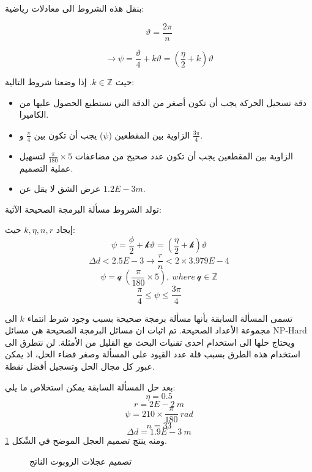 بنقل هذه الشروط الى معادلات رياضية:

\begin{equation}
\vartheta=\frac{2\pi}{n}
\end{equation}

\begin{equation}
	\rightarrow\psi=\frac{\vartheta}{4}+{k}\vartheta=\left(\frac{\eta}{2}+{k}\right)\vartheta
\end{equation}

حيث $ {k}\in\mathbb{Z} $. إذا وضعنا شروط التالية:

\begin{itemize}
	\item دقة تسجيل الحركة يجب أن تكون أصغر من الدقة التي نستطيع الحصول عليها من الكاميرا.
	\item 	الزاوية بين المقطعين ($ \psi $) يجب أن تكون بين $ \frac{\pi}{4} $ و $ \frac{3\pi}{4} $.
	\item 	الزاوية بين المقطعين يجب أن تكون عدد صحيح من مضاعفات $ \frac{\pi}{180}\times5 $ لتسهيل عملية التصميم.
	\item 	عرض الشق لا يقل عن $1.2 E-3m$.
\end{itemize}

تولد الشروط مسألة البرمجة الصحيحة الآتية:

إيجاد $k, \eta, n, r$ حيث:
\begin{equation}
\psi=\frac{\phi}{2}+\mathcal{k}\vartheta=\left(\frac{\eta}{2}+\mathcal{k}\right)\vartheta
\end{equation}
\begin{equation}
\Delta d<2.5E-3\rightarrow\frac{r}{n}<2\times3.979E-4
\end{equation}
\begin{equation}
\psi=\mathcal{q}\ \left(\frac{\pi}{180}\times5\right),\ where\ \mathcal{q}\in\mathbb{Z}
\end{equation}
\begin{equation}
\frac{\pi}{4}\le\psi\le\frac{3\pi}{4}
\end{equation}


تسمى المسألة السابقة بأنها مسألة برمجة صحيحة بسبب وجود شرط انتماء $k$ الى مجموعة الأعداد الصحيحة. تم اثبات ان مسائل البرمجة الصحيحة هي مسائل NP-Hard ويحتاج حلها الى استخدام احدى تقنيات البحث مع القليل من الأمثلة. لن نتطرق الى استخدام هذه الطرق بسبب قلة عدد القيود على المسألة وصغر فضاء الحل، اذ يمكن عبور كل مجال الحل وتسجيل أفضل نقطة.


بعد حل المسألة السابقة يمكن استخلاص ما يلي:
\begin{equation}
\eta=0.5
\end{equation}
\begin{equation}
r=2E-2\ m
\end{equation}
\begin{equation}
\psi=210\times\frac{\pi}{180}\ rad
\end{equation}
\begin{equation}
n=33
\end{equation}
\begin{equation}
\Delta d=1.9E-3\ m
\end{equation}
ومنه ينتج تصميم العجل الموضح في الشّكل \ref{14:fig:1}.

\begin{figure}[htbp]
	\centering
	
	\caption{تصميم عجلات الروبوت الناتج}
	\label{14:fig:1}
\end{figure}

